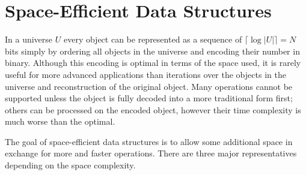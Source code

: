 \section{Space-Efficient Data Structures}

In a universe $U$ every object can be represented as a sequence of $\lceil \log |U| \rceil = N$ bits simply by ordering all objects in the universe and encoding their number in binary.
Although this encoding is optimal in terms of the space used, it is rarely useful for more advanced applications than iterations over the objects in the universe and reconstruction of the original object.
Many operations cannot be supported unless the object is fully decoded into a more traditional form first; others can be processed on the encoded object, however their time complexity is much worse than the optimal.

The goal of space-efficient data structures is to allow some additional space in exchange for more and faster operations.
There are three major representatives depending on the space complexity.

